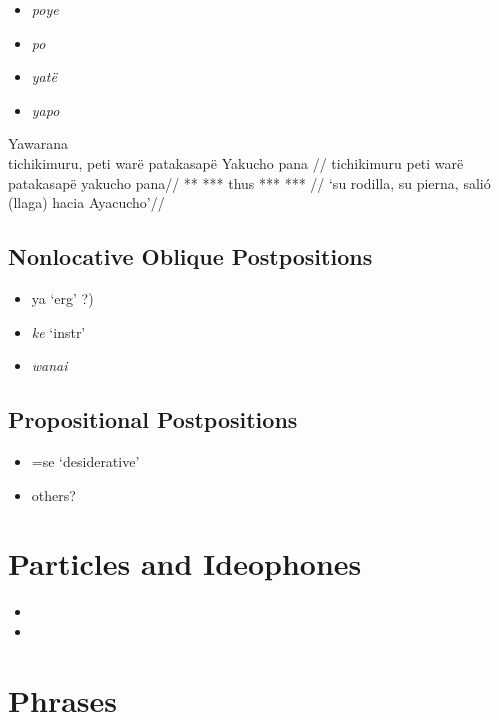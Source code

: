 \documentclass{memoir}
\begin{document}
\begin{itemize}
\tightlist
\item
  \emph{poye}
\item
  \emph{po}
\item
  \emph{yatë}
\item
  \emph{yapo}
\end{itemize}

\ex Yawarana \\
\label{histpajirdi-186}    \begingl
    \glpreamble  tichikimuru, peti warë patakasapë Yakucho pana //
    \gla tichikimuru peti warë patakasapë yakucho pana//
    \glb *** *** thus *** *** //
        \glft ‘su rodilla, su pierna, salió (llaga) hacia Ayacucho’//  
    \endgl 
\xe

\section{Nonlocative Oblique Postpositions}

\begin{itemize}
\tightlist
\item
   ya `erg' ?)
\item
  \emph{ke} `instr'
\item
  \emph{wanai}
\end{itemize}

\section{Propositional Postpositions}

\begin{itemize}
\tightlist
\item
  =se `desiderative'
\item
  others?
\end{itemize}

\chapter{\texorpdfstring{Particles and Ideophones
\label{partideo}}{Particles and Ideophones }}

\begin{itemize}
\tightlist
\item
\item
\end{itemize}

\chapter{\texorpdfstring{Phrases \label{phrases}}{Phrases }}
\end{document}
